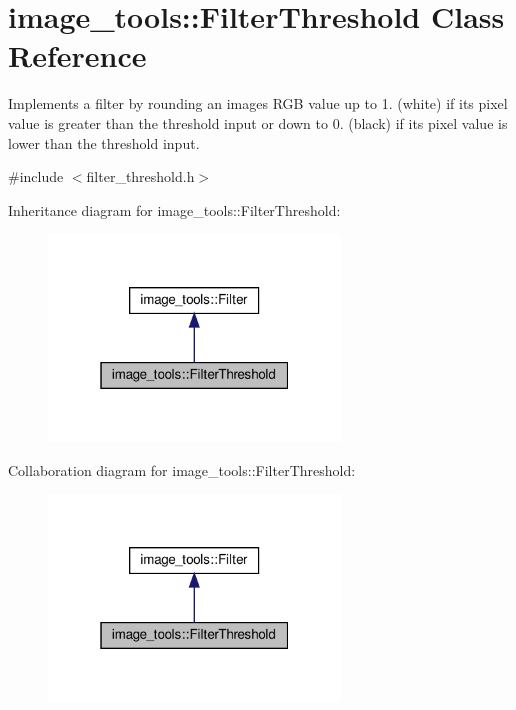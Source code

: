 \hypertarget{classimage__tools_1_1FilterThreshold}{}\section{image\+\_\+tools\+:\+:Filter\+Threshold Class Reference}
\label{classimage__tools_1_1FilterThreshold}


Implements a filter by rounding an image\textquotesingle{}s R\+GB value up to 1. (white) if it\textquotesingle{}s pixel value is greater than the threshold input or down to 0. (black) if it\textquotesingle{}s pixel value is lower than the threshold input.  




{\ttfamily \#include $<$filter\+\_\+threshold.\+h$>$}



Inheritance diagram for image\+\_\+tools\+:\+:Filter\+Threshold\+:
\nopagebreak
\begin{figure}[H]
\begin{center}
\leavevmode
\includegraphics[width=220pt]{classimage__tools_1_1FilterThreshold__inherit__graph}
\end{center}
\end{figure}


Collaboration diagram for image\+\_\+tools\+:\+:Filter\+Threshold\+:
\nopagebreak
\begin{figure}[H]
\begin{center}
\leavevmode
\includegraphics[width=220pt]{classimage__tools_1_1FilterThreshold__coll__graph}
\end{center}
\end{figure}
